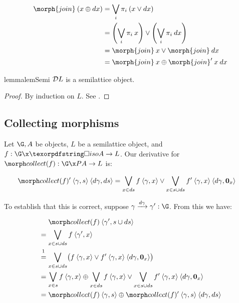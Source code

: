 \documentclass{rntz}\usepackage{fantasy}%
\begin{document}
\nopagebreak[2]
\begin{align*}
  \morph{join}\<(x \upd \dx) &= \bigvee_i \pi_i \<(x \vee \dx)\\
  &= \left(\bigvee_i \pi_i\<x\right) \vee \left(\bigvee_i \pi_i\<\dx\right)\\
  &= \morph{join}\<x \vee \morph{join}\<\dx\\
  &= \morph{join}\<x \upd \deriv{\morph{join}}\<x\<\dx
\end{align*}

\begin{restatable}{lemma}{lemSemi}
  \label{lem:semi} $\mathcal{D} L$ is a semilattice object.
\end{restatable}
\begin{proof}
  By induction on $L$. See .
\end{proof}


\subsection{Collecting morphisms}
\label{sec:CP-collect}

Let $\G, A$ be objects, $L$ be a semilattice object, and $f : \G \x \isof A \to
L$. Our derivative for $\pcollect f : \G \x \pfinof A \to L$ is:

\nopagebreak[2]
\begin{align*}
  \deriv{\pcollect f} \<\tuple{\gamma,s} \<\tuple{\dgamma,\ds}
  &= \bigvee_{x \in \ds} f\<\tuple{\gamma,x} \vee
  \bigvee_{x \in s \cup \ds} \deriv f \<\tuple{\gamma,x} \<\tuple{\dgamma, \zero_x}
\end{align*}

\noindent To establish that this is correct, suppose
$\longvld{\dgamma}{\gamma}{\gamma'} : \G$. From this we have:

\nopagebreak[2]
\begin{align*}
  &\phantom{{}={}}\pcollect{f} \<\tuple{\gamma', s \cup \ds}
  \\
  &= \bigvee_{x \in s \cup \ds} f \<\tuple{\gamma', x}
  \\
  &\overset{\footnotemark}{=} \bigvee_{x \in s \cup \ds} \bigl(f \<\tuple{\gamma,x}
  \vee \deriv f \<\tuple{\gamma,x} \<\tuple{\dgamma,\zero_x}\bigr)
  \\
  &= \bigvee_{x \in s} f\<\tuple{\gamma,x}
  \upd \bigvee_{x \in \ds} f\<\tuple{\gamma,x}
  \vee \bigvee_{x \in s \cup \ds} \deriv f \<\tuple{\gamma,x} \<\tuple{\dgamma,\zero_x}
  \\
  &= \pcollect f \<\tuple{\gamma,s}
  \upd \deriv{\pcollect f} \<\tuple{\gamma,s} \<\tuple{\dgamma,\ds}
\end{align*}
\end{document}

